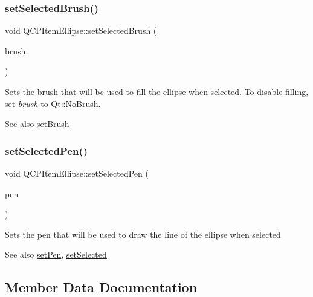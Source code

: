 \subsubsection{\texorpdfstring{setSelectedBrush()}{setSelectedBrush()}}
{\footnotesize\ttfamily void Q\+C\+P\+Item\+Ellipse\+::set\+Selected\+Brush (\begin{DoxyParamCaption}\item[{const Q\+Brush \&}]{brush }\end{DoxyParamCaption})}

Sets the brush that will be used to fill the ellipse when selected. To disable filling, set {\itshape brush} to Qt\+::\+No\+Brush.

\begin{DoxySeeAlso}{See also}
\mbox{\hyperlink{class_q_c_p_item_ellipse_a49fc74e6965834e873d027d026def798}{set\+Brush}} 
\end{DoxySeeAlso}
\mbox{\label{class_q_c_p_item_ellipse_a6c542fba1dc918041c583f58a50dde99}} 
\subsubsection{\texorpdfstring{setSelectedPen()}{setSelectedPen()}}
{\footnotesize\ttfamily void Q\+C\+P\+Item\+Ellipse\+::set\+Selected\+Pen (\begin{DoxyParamCaption}\item[{const Q\+Pen \&}]{pen }\end{DoxyParamCaption})}

Sets the pen that will be used to draw the line of the ellipse when selected

\begin{DoxySeeAlso}{See also}
\mbox{\hyperlink{class_q_c_p_item_ellipse_adb81a663ed2420fcfa011e49f678d1a6}{set\+Pen}}, \mbox{\hyperlink{class_q_c_p_abstract_item_a203de94ad586cc44d16c9565f49d3378}{set\+Selected}} 
\end{DoxySeeAlso}


\subsection{Member Data Documentation}
\mbox{\label{class_q_c_p_item_ellipse_a2dc80ff9f5db600eae0133bdde65066f}} 
